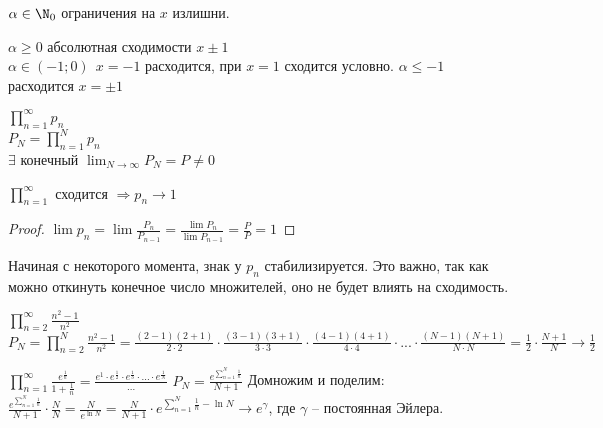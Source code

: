 \begin{Rem}
    $\alpha \in \N_0$ ограничения на $x$ излишни. 
\end{Rem}

\begin{Rem}
    $\alpha \geqslant 0$ абсолютная сходимости $x \pm 1$\\
    $\alpha \in (-1; 0) \ \ x = -1$ расходится, при $x = 1$ сходится условно.
    $\alpha \leqslant -1$ расходится $x = \pm 1$
\end{Rem}


\begin{Def} 
    $\prod_{n=1}^{\infty} p_n$\\
    $P_N = \prod_{n=1}^N p_n$\\
    $\displaystyle \exists$ конечный $\lim_{N \to \infty} P_N = P \neq 0$
\end{Def} 

\begin{Thm} 
    $\prod_{n=1}^{\infty}$ сходится $\Rightarrow  p_n \to 1$ 
\end{Thm} 

\begin{proof}
    $\lim p_n = \lim \frac{P_n}{P_{n-1}} = \frac{\lim P_n}{\lim P_{n-1}} = \frac{P}{P} = 1$ 
\end{proof}

\begin{Rem}
    Начиная с некоторого момента, знак у $p_n$ стабилизируется. Это важно, так как можно откинуть конечное число множителей, оно не будет влиять на сходимость. 
\end{Rem}

\begin{Example}
    $\prod_{n=2}^{\infty} \frac{n^2 - 1}{n^2}$\\
    $P_N = \prod_{n=2}^N \frac{n^2 - 1}{n^2} = \frac{(2-1)(2+1)}{2 \cdot 2} \cdot \frac{(3-1)(3+1)}{3 \cdot 3} \cdot \frac{(4-1)(4+1)}{4 \cdot 4} \cdot ... \cdot \frac{(N-1)(N+1)}{N \cdot N} 
    = \frac{1}{2} \cdot \frac{N+1}{N} \to \frac{1}{2}$
\end{Example}

\begin{Example}
    $\prod_{n=1}^{\infty} \frac{e^{\frac{1}{n}}}{1 + \frac{1}{n}} = \frac{e^1 \cdot e^{\frac{1}{2}} \cdot e^{\frac{1}{3}} \cdot ... \cdot e^{\frac{1}{N}}}{...} $
    $P_N = \frac{e^{\sum_{n=1}^{N} \frac{1}{n}}}{N+1}$
    Домножим и поделим: $\frac{e^{\sum_{n=1}^{N} \frac{1}{n}}}{N+1} \cdot \frac{N}{N} = \frac{N}{e^{\ln N}} = \frac{N}{N+1} \cdot e^{\sum_{n=1}^{N} \frac{1}{n} - \ln N} \to e^{\gamma}$, где $\gamma$ -- постоянная Эйлера.  
\end{Example}

